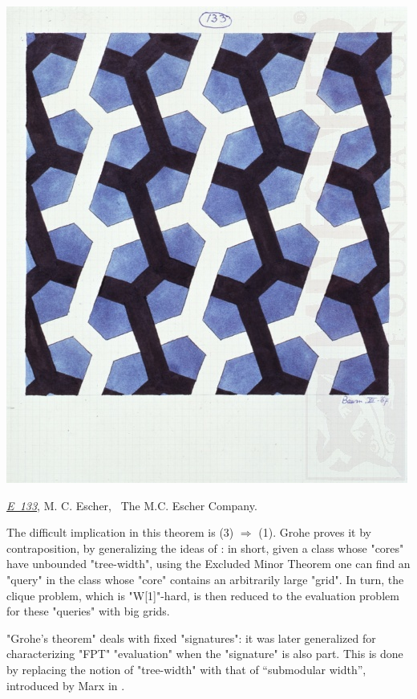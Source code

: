 \begin{marginfigure}
	\centering
	\includegraphics[width=\linewidth]{fig/escher/e133.jpg}
	\caption{\href{https://mcescher.com/gallery/watercolor/\#iLightbox[gallery\_image_1]/3}{\emph{E~133}}, M. C. Escher, \textcopyright~The M.C. Escher Company.}
\end{marginfigure}
The difficult implication in this theorem is (3) $\Rightarrow$ (1).
Grohe proves it by contraposition, by generalizing
the ideas of \cite{GroheSchwentickSegoufin2001Evaluation}:
in short, given a class whose "cores" have unbounded "tree-width",
using the Excluded Minor Theorem \cite[$\ast$ (1.5)]{RobertsonSeymour1986GraphMinors5}
one can find an "query" in the class whose "core" 
contains an arbitrarily large "grid". In turn, the clique problem,
which is "W[1]"-hard, is then reduced to the evaluation problem
for these "queries" with big grids.

"Grohe's theorem" deals with fixed "signatures": it was later generalized \cite[Theorem~1]{ChenGottlobLanzingerPichler2020Semantic} for characterizing "FPT" "evaluation" when the "signature" is also part. This is done by replacing the notion of "tree-width" with 
that of ``submodular width'', introduced by Marx in \cite{Marx13Tractable}.

